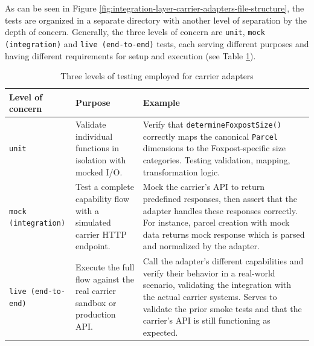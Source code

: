 \documentclass{imc-inf}
\begin{document}
As can be seen in Figure \ref{fig:integration-layer-carrier-adapters-file-structure}, the tests are organized in a separate directory with another level of separation by the depth of concern.
Generally, the three levels of concern are \texttt{unit}, \texttt{mock (integration)} and \texttt{live (end-to-end)} tests, each serving different purposes and having different requirements for setup and execution (see Table \ref{tab:testing-levels}).

\begin{table}[!htbp]
  \centering
  \small
  \begin{tabular}{@{}>{\raggedright\arraybackslash}p{3.5cm}p{4cm}p{7cm}@{}}
    \toprule
    \textbf{Level of concern}   & \textbf{Purpose}                                                          & \textbf{Example}                                                                                                                                                                                                                                                \\
    \midrule
    \texttt{unit}               & Validate individual functions in isolation with mocked I/O.               & Verify that \texttt{determineFoxpostSize()} correctly maps the canonical \texttt{Parcel} dimensions to the Foxpost-specific size categories. Testing validation, mapping, transformation logic.                                                                 \\[6pt]
    \texttt{mock (integration)} & Test a complete capability flow with a simulated carrier HTTP endpoint.   & Mock the carrier's API to return predefined responses, then assert that the adapter handles these responses correctly. For instance, parcel creation with mock data returns mock response which is parsed and normalized by the adapter.                        \\[6pt]
    \texttt{live (end-to-end)}  & Execute the full flow against the real carrier sandbox or production API. & Call the adapter's different capabilities and verify their behavior in a real-world scenario, validating the integration with the actual carrier systems. Serves to validate the prior smoke tests and that the carrier's API is still functioning as expected. \\
    \bottomrule
  \end{tabular}
  \caption{Three levels of testing employed for carrier adapters}
  \label{tab:testing-levels}
\end{table}
\end{document}
